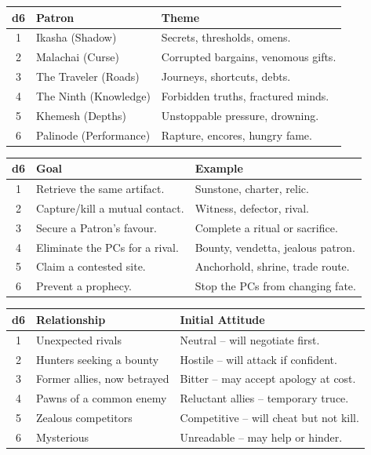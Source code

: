 \begin{tcolorbox}[title=Patron (roll once per character or once for the party), colback=white!97!gray, colframe=black!80!gray]
\centering
\begin{tabular}{cll}
\toprule
\textbf{d6} & \textbf{Patron} & \textbf{Theme} \\
\midrule
1 & Ikasha (Shadow) & Secrets, thresholds, omens. \\
2 & Malachai (Curse) & Corrupted bargains, venomous gifts. \\
3 & The Traveler (Roads) & Journeys, shortcuts, debts. \\
4 & The Ninth (Knowledge) & Forbidden truths, fractured minds. \\
5 & Khemesh (Depths) & Unstoppable pressure, drowning. \\
6 & Palinode (Performance) & Rapture, encores, hungry fame. \\
\bottomrule
\end{tabular}
\end{tcolorbox}

\begin{tcolorbox}[title=Goal (pressure or obstacle), colback=white!97!gray, colframe=black!80!gray]
\centering
\begin{tabular}{cll}
\toprule
\textbf{d6} & \textbf{Goal} & \textbf{Example} \\
\midrule
1 & Retrieve the same artifact. & Sunstone, charter, relic. \\
2 & Capture/kill a mutual contact. & Witness, defector, rival. \\
3 & Secure a Patron’s favour. & Complete a ritual or sacrifice. \\
4 & Eliminate the PCs for a rival. & Bounty, vendetta, jealous patron. \\
5 & Claim a contested site. & Anchorhold, shrine, trade route. \\
6 & Prevent a prophecy. & Stop the PCs from changing fate. \\
\bottomrule
\end{tabular}
\end{tcolorbox}

\begin{tcolorbox}[title=Relationship to PCs, colback=white!97!gray, colframe=black!80!gray]
\centering
\begin{tabular}{cll}
\toprule
\textbf{d6} & \textbf{Relationship} & \textbf{Initial Attitude} \\
\midrule
1 & Unexpected rivals & Neutral – will negotiate first. \\
2 & Hunters seeking a bounty & Hostile – will attack if confident. \\
3 & Former allies, now betrayed & Bitter – may accept apology at cost. \\
4 & Pawns of a common enemy & Reluctant allies – temporary truce. \\
5 & Zealous competitors & Competitive – will cheat but not kill. \\
6 & Mysterious & Unreadable – may help or hinder. \\
\bottomrule
\end{tabular}
\end{tcolorbox}

